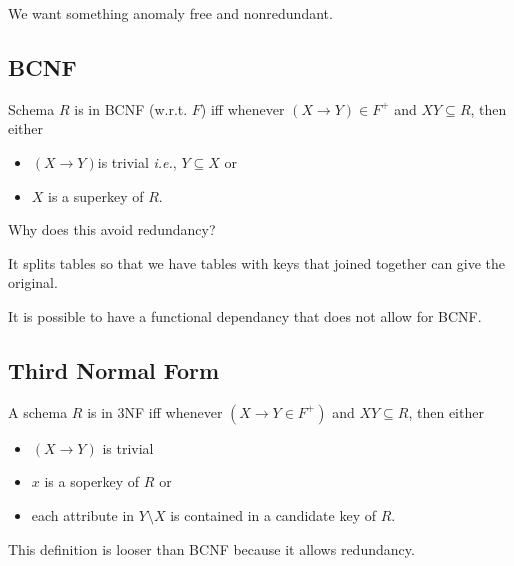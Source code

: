 \documentclass[12pt]{article}
\begin{document}
We want something anomaly free and nonredundant.

\subsection{BCNF}

Schema $R$ is in BCNF (w.r.t. $F$) iff whenever $(X \to Y) \in F^+$ and
$XY \subseteq R$, then either
\begin{itemize}
	\item $(X \to Y)$is trivial \textit{i.e.}, $Y \subseteq X$ or
	\item $X$ is a superkey of $R$.
\end{itemize}

Why does this avoid redundancy?

It splits tables so that we have tables with keys that joined together can give
the original.

It is possible to have a functional dependancy that does not allow for BCNF.

\subsection{Third Normal Form}

A schema $R$ is in 3NF iff whenever $(X \to Y \in F^+)$ and $XY \subseteq R$,
then either
\begin{itemize}
	\item $(X \to Y)$ is trivial
	\item $x$ is a soperkey of $R$ or 
	\item each attribute in $Y\setminus X$ is contained in a candidate key of
		$R$.
\end{itemize}

This definition is looser than BCNF because it allows redundancy.
\end{document}
